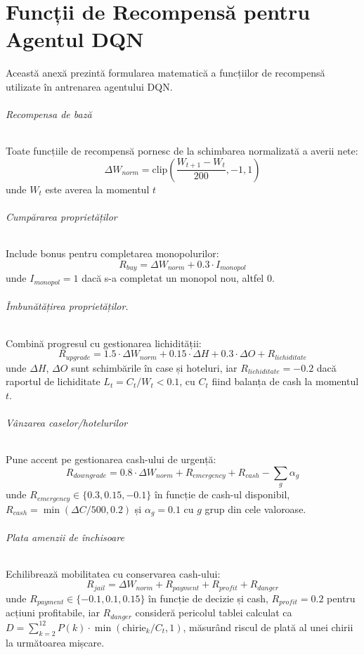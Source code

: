 \chapter{Funcții de Recompensă pentru Agentul DQN}
\label{annex:reward_functions}

Această anexă prezintă formularea matematică a funcțiilor de recompensă utilizate în antrenarea agentului DQN.

\subparagraph{Recompensa de bază} Toate funcțiile de recompensă pornesc de la schimbarea normalizată a averii nete:
\begin{equation}
\Delta W_{norm} = \text{clip}\left(\frac{W_{t+1} - W_t}{200}, -1, 1\right)
\end{equation}
unde $W_t$ este averea la momentul $t$

\subparagraph{Cumpărarea proprietăților} Include bonus pentru completarea monopolurilor:
\begin{equation}
R_{buy} = \Delta W_{norm} + 0.3 \cdot I_{monopol}
\end{equation}
unde $I_{monopol} = 1$ dacă s-a completat un monopol nou, altfel 0.

\subparagraph{Îmbunătățirea proprietăților.} Combină progresul cu gestionarea lichidității:
\begin{equation}
R_{upgrade} = 1.5 \cdot \Delta W_{norm} + 0.15 \cdot \Delta H + 0.3 \cdot \Delta O + R_{lichiditate}
\end{equation}
unde $\Delta H$, $\Delta O$ sunt schimbările în case și hoteluri, iar $R_{lichiditate} = -0.2$ dacă raportul de lichiditate $L_t = C_t/W_t < 0.1$, cu $C_t$ fiind balanța de cash la momentul $t$.

\subparagraph{Vânzarea caselor/hotelurilor} Pune accent pe gestionarea cash-ului de urgență:
\begin{equation}
R_{downgrade} = 0.8 \cdot \Delta W_{norm} + R_{emergency} + R_{cash} - \sum_{g} \alpha_g
\end{equation}
unde $R_{emergency} \in \{0.3, 0.15, -0.1\}$ în funcție de cash-ul disponibil, $R_{cash} = \min(\Delta C/500, 0.2)$ și $\alpha_g = 0.1$ cu $g$ grup din cele valoroase.

\subparagraph{Plata amenzii de închisoare} Echilibrează mobilitatea cu conservarea cash-ului:
\begin{equation}
R_{jail} = \Delta W_{norm} + R_{payment} + R_{profit} + R_{danger}
\end{equation}
unde $R_{payment} \in \{-0.1, 0.1, 0.15\}$ în funcție de decizie și cash, $R_{profit} = 0.2$ pentru acțiuni profitabile, iar $R_{danger}$ consideră pericolul tablei calculat ca $D = \sum_{k=2}^{12} P(k) \cdot \min(\text{chirie}_k/C_t, 1)$, măsurând riscul de plată al unei chirii la următoarea mișcare.

